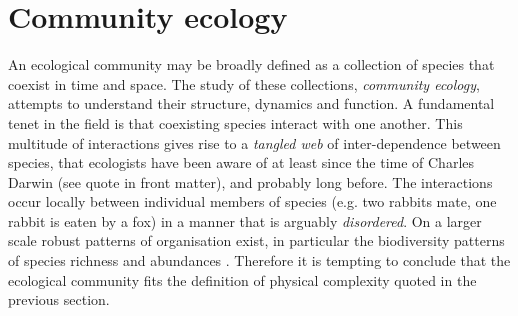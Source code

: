   
\section{Community ecology}
\label{sec:intro_community_ecology}


An ecological community may be broadly defined as a collection of species that coexist in time and space. The study of these collections, \emph{community ecology}, attempts to understand their structure, dynamics and function. A fundamental tenet in the field is that coexisting species interact with one another. This multitude of interactions gives rise to a \emph{tangled web} of inter-dependence between species, that ecologists have been aware of at least since the time of Charles Darwin \cite{darwin2009origin} (see quote in front matter), and probably long before. The interactions occur locally between individual members of species (e.g. two rabbits mate, one rabbit is eaten by	 a fox) in a manner that is arguably \emph{disordered}. On a larger scale robust patterns of organisation exist, in particular the biodiversity patterns of species richness and abundances \cite{sanderson2015patterns, purves2005ecological}. Therefore it is tempting to conclude that the ecological community fits the definition of physical complexity quoted in the previous section. %

